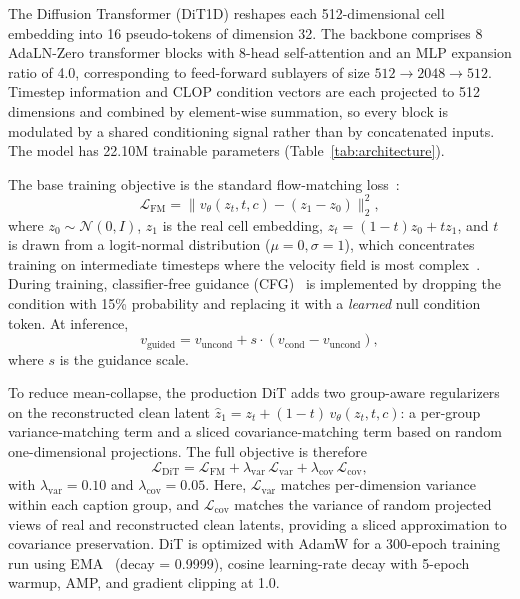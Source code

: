 \documentclass[fleqn,10pt,lineno]{wlpeerj}
\begin{document}
The Diffusion Transformer (DiT1D) reshapes each 512-dimensional cell embedding into 16 pseudo-tokens of dimension 32. The backbone comprises 8 AdaLN-Zero transformer blocks with 8-head self-attention and an MLP expansion ratio of 4.0, corresponding to feed-forward sublayers of size $512 \to 2048 \to 512$. Timestep information and CLOP condition vectors are each projected to 512 dimensions and combined by element-wise summation, so every block is modulated by a shared conditioning signal rather than by concatenated inputs. The model has 22.10M trainable parameters (Table~\ref{tab:architecture}).

The base training objective is the standard flow-matching loss~\citep{ref-flow-matching,ref-ot-cfm}:
\begin{equation}
\mathcal{L}_\text{FM} = \| v_\theta(z_t, t, c) - (z_1 - z_0) \|_2^2,
\label{eq:fm}
\end{equation}
where $z_0 \sim \mathcal{N}(0, I)$, $z_1$ is the real cell embedding, $z_t = (1-t)z_0 + tz_1$, and $t$ is drawn from a logit-normal distribution ($\mu{=}0, \sigma{=}1$), which concentrates training on intermediate timesteps where the velocity field is most complex~\citep{ref-sd3}. During training, classifier-free guidance (CFG)~\citep{ref-cfg} is implemented by dropping the condition with 15\% probability and replacing it with a \emph{learned} null condition token. At inference,
\begin{equation}
v_\text{guided} = v_\text{uncond} + s \cdot (v_\text{cond} - v_\text{uncond}),
\label{eq:cfg}
\end{equation}
where $s$ is the guidance scale.

To reduce mean-collapse, the production DiT adds two group-aware regularizers on the reconstructed clean latent $\hat{z}_1 = z_t + (1-t)\,v_\theta(z_t,t,c)$: a per-group variance-matching term and a sliced covariance-matching term based on random one-dimensional projections. The full objective is therefore
\begin{equation}
\mathcal{L}_\text{DiT} = \mathcal{L}_\text{FM} + \lambda_\text{var}\,\mathcal{L}_\text{var} + \lambda_\text{cov}\,\mathcal{L}_\text{cov},
\label{eq:var-loss}
\end{equation}
with $\lambda_\text{var}=0.10$ and $\lambda_\text{cov}=0.05$. Here, $\mathcal{L}_\text{var}$ matches per-dimension variance within each caption group, and $\mathcal{L}_\text{cov}$ matches the variance of random projected views of real and reconstructed clean latents, providing a sliced approximation to covariance preservation. DiT is optimized with AdamW for a 300-epoch training run using EMA~\citep{ref-ema} (decay = 0.9999), cosine learning-rate decay with 5-epoch warmup, AMP, and gradient clipping at 1.0.
\end{document}
